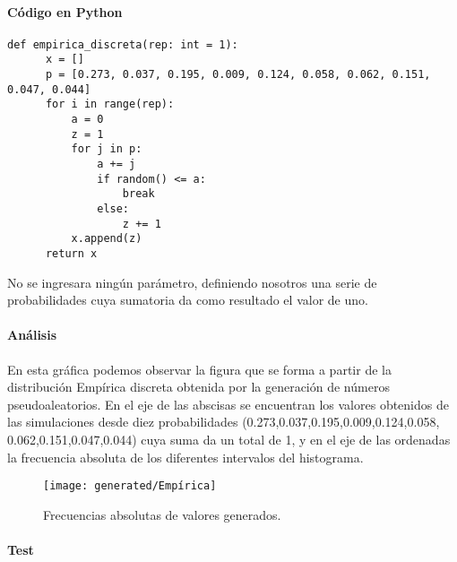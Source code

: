 \documentclass{article}
\begin{document}
  \paragraph{Código en Python}
  \begin{lstlisting}[style = Python]
    def empirica_discreta(rep: int = 1):
      x = []
      p = [0.273, 0.037, 0.195, 0.009, 0.124, 0.058, 0.062, 0.151, 0.047, 0.044]
      for i in range(rep):
          a = 0
          z = 1
          for j in p:
              a += j
              if random() <= a:
                  break
              else:
                  z += 1
          x.append(z)
      return x
  \end{lstlisting}
  No se ingresara ningún parámetro, definiendo nosotros una serie de probabilidades cuya sumatoria da como resultado el valor de uno.


  \paragraph{Análisis\newline}
  En esta gráfica podemos observar la figura que se forma a partir de la distribución Empírica discreta obtenida por
  la generación de números pseudoaleatorios. En el eje de las abscisas
  se encuentran los valores obtenidos de las simulaciones desde diez probabilidades (0.273,0.037,0.195,0.009,0.124,0.058,
  0.062,0.151,0.047,0.044) cuya suma da un total de 1, y en
  el eje de las ordenadas la frecuencia absoluta de los diferentes intervalos del histograma.
    \begin{figure}[h]
      \centering
      \texttt{[image: generated/Empírica]}
      \caption{Frecuencias absolutas de valores generados.}
    \end{figure}


  \paragraph{Test\newline}
\end{document}
